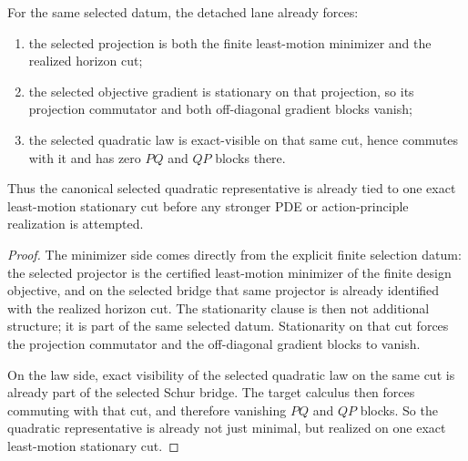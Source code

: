 \begin{theorem}
\label{thm:the-canonical-quadratic-representative-already-lives-on-the-least-motion-stationary-cut}
For the same selected datum, the detached lane already forces:
\begin{enumerate}
\item the selected projection is both the finite least-motion minimizer and
      the realized horizon cut;
\item the selected objective gradient is stationary on that projection, so its
      projection commutator and both off-diagonal gradient blocks vanish;
\item the selected quadratic law is exact-visible on that same cut, hence
      commutes with it and has zero \(PQ\) and \(QP\) blocks there.
\end{enumerate}
Thus the canonical selected quadratic representative is already tied to one
exact least-motion stationary cut before any stronger PDE or
action-principle realization is attempted.
\end{theorem}

\begin{proof}
The minimizer side comes directly from the explicit finite selection datum: the
selected projector is the certified least-motion minimizer of the finite design
objective, and on the selected bridge that same projector is already
identified with the realized horizon cut. The stationarity clause is then not
additional structure; it is part of the same selected datum. Stationarity on
that cut forces the projection commutator and the off-diagonal gradient blocks
to vanish.

On the law side, exact visibility of the selected quadratic law on the same
cut is already part of the selected Schur bridge. The target calculus then
forces commuting with that cut, and therefore vanishing \(PQ\) and \(QP\)
blocks. So the quadratic representative is already not just minimal, but
realized on one exact least-motion stationary cut.
\end{proof}


